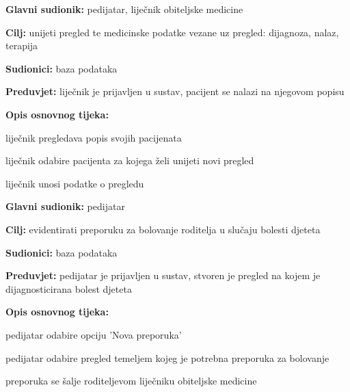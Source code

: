                     \noindent {}
					\begin{packed_item}
	
						\item \textbf{Glavni sudionik: }pedijatar, liječnik obiteljske medicine
						\item  \textbf{Cilj:} unijeti pregled te medicinske podatke vezane uz pregled: dijagnoza, nalaz, terapija
						\item  \textbf{Sudionici:} baza podataka
						\item  \textbf{Preduvjet:} liječnik je prijavljen u sustav, pacijent se nalazi na njegovom popisu
						\item  \textbf{Opis osnovnog tijeka:}
						
						\item[] \begin{packed_enum}
	
							\item liječnik pregledava popis svojih pacijenata
							\item liječnik odabire pacijenta za kojega želi unijeti novi pregled
							\item liječnik unosi podatke o pregledu

						\end{packed_enum}
					
					\end{packed_item}

                    \noindent {}
					\begin{packed_item}
	
						\item \textbf{Glavni sudionik: }pedijatar
						\item  \textbf{Cilj:} evidentirati preporuku za bolovanje roditelja u slučaju bolesti djeteta
						\item  \textbf{Sudionici:} baza podataka
						\item  \textbf{Preduvjet:} pedijatar je prijavljen u sustav, stvoren je pregled na kojem je dijagnosticirana bolest djeteta
						\item  \textbf{Opis osnovnog tijeka:}
						
						\item[] \begin{packed_enum}
	
							\item pedijatar odabire opciju 'Nova preporuka'
							\item pedijatar odabire pregled temeljem kojeg je potrebna preporuka za bolovanje
							\item preporuka se šalje roditeljevom liječniku obiteljske medicine

						\end{packed_enum}
                    \end{packed_item}
						
